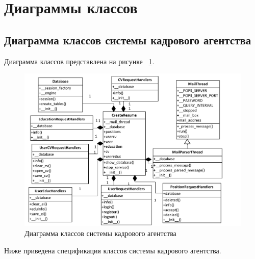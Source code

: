 \section{Диаграммы классов}
\subsection{Диаграмма классов системы кадрового агентства}
Диаграмма классов представлена на рисунке ~\ref{fig:Visio-hh-uml}.

\begin{figure}[ht!]
\centering
 \includegraphics[width=\textwidth]{include/Visio-hh-uml.pdf}
\caption{Диаграмма классов системы кадрового агентства}
\label{fig:Visio-hh-uml}
\end{figure}

Ниже приведена спецификация классов системы кадрового агентства.

